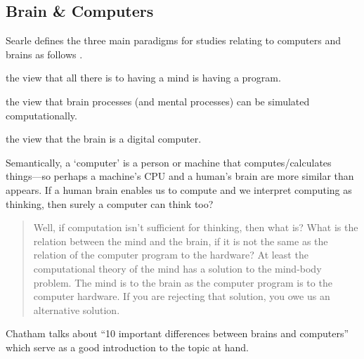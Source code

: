 


\subsection{Brain \& Computers}
\label{s:braincomp}

Searle defines the three main paradigms for studies relating to computers and brains as follows \autocite*{Searle1990}.

\begin{description}[leftmargin=4cm]
  \item[Strong AI] the view that all there is to having a mind is having a program.
  \item[Weak AI] the view that brain processes (and mental processes) can be simulated computationally.
  \item[Cognitivism] the view that the brain is a digital computer.
\end{description}

Semantically, a `computer' is a person or machine that computes/calculates things---so perhaps a machine's \ac{CPU} and a human's brain are more similar than appears. If a human brain enables us to compute and we interpret computing as thinking, then surely a computer can think too?

\begin{quotation}
  Well, if computation isn’t sufficient for thinking, then what is? What is the relation between the mind and the brain, if it is not the same as the relation of the computer program to the hardware? At least the computational theory of the mind has a solution to the mind-body problem. The mind is to the brain as the computer program is to the computer hardware. If you are rejecting that solution, you owe us an alternative solution.
\end{quotation}

Chatham talks about ``10 important differences between brains and computers'' \autocite*{Chatham2007} which serve as a good introduction to the topic at hand.

